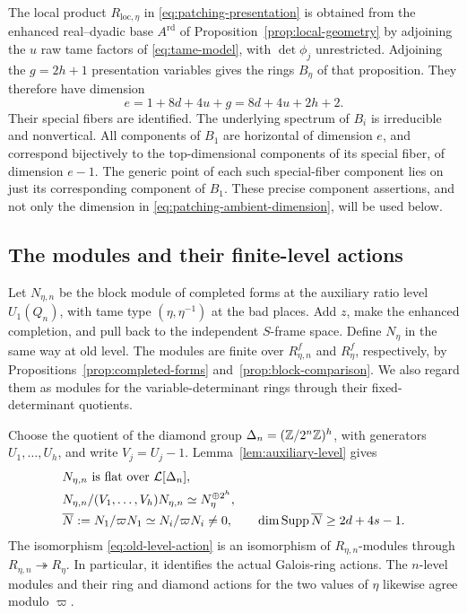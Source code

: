 The local product $R_{\mathrm{loc},\eta}$ in
\eqref{eq:patching-presentation} is obtained from the enhanced
real--dyadic base $A^{\mathrm{rd}}$ of
Proposition~\ref{prop:local-geometry} by adjoining the $u$ raw tame
factors of \eqref{eq:tame-model}, with $\det\phi_j$ unrestricted.
Adjoining the $g=2h+1$ presentation variables gives
the rings $B_\eta$ of that proposition. They therefore have dimension
\begin{equation}\label{eq:patching-ambient-dimension}
 e=1+8d+4u+g=8d+4u+2h+2.
\end{equation}
Their special fibers are identified.  The underlying spectrum of
$B_i$ is irreducible and nonvertical.  All components of $B_1$
are horizontal of dimension $e$, and correspond bijectively to
the top-dimensional components of its special fiber, of dimension
$e-1$.  The generic point of each such special-fiber component lies
on just its corresponding component of $B_1$.  These precise
component assertions, and not only the dimension in
\eqref{eq:patching-ambient-dimension}, will be used below.

\subsection{The modules and their finite-level actions}

Let $N_{\eta,n}$ be the block module of completed forms at the
auxiliary ratio level $U_1(Q_n)$, with tame type
$(\eta,\eta^{-1})$ at the bad places.  Add $z$, make the enhanced
completion, and pull back to the independent $S$-frame space.
Define $N_\eta$ in the same way at old level.  The modules are
finite over $R_{\eta,n}^f$ and $R_\eta^f$, respectively, by
Propositions~\ref{prop:completed-forms} and~\ref{prop:block-comparison}.
We also regard them as modules for the variable-determinant rings
through their fixed-determinant quotients.

Choose the quotient of the diamond group
$\Delta_n=(\mathbb Z/2^n\mathbb Z)^h$, with generators $U_1,\ldots,U_h$,
and write $V_j=U_j-1$.  Lemma~\ref{lem:auxiliary-level} gives
\begin{align}
 &N_{\eta,n}\text{ is flat over }\mathcal L[\Delta_n],
                                                        \label{eq:auxiliary-flatness}\\
 &N_{\eta,n}/(V_1,\ldots,V_h)N_{\eta,n}
       \simeq N_\eta^{\oplus 2^h},                       \label{eq:old-level-action}\\
 &\overline N:=N_1/\varpi N_1\simeq N_i/\varpi N_i\ne0,
 \qquad \dim\operatorname{Supp}\overline N\geq 2d+4s-1.             \label{eq:old-residue-dimension}
\end{align}
The isomorphism \eqref{eq:old-level-action} is an isomorphism of
$R_{\eta,n}$-modules through $R_{\eta,n}\twoheadrightarrow R_\eta$.
In particular, it identifies the actual Galois-ring actions.
The $n$-level modules and their ring and diamond actions for the two
values of $\eta$ likewise agree modulo $\varpi$.

